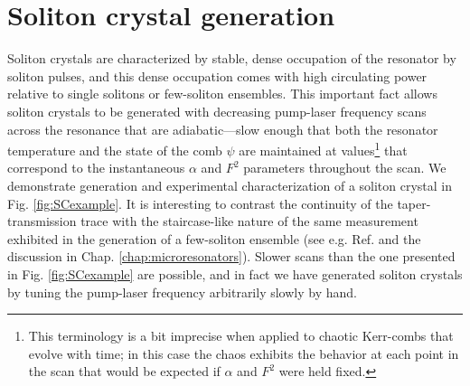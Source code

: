 \section{Soliton crystal generation}

Soliton crystals are characterized by stable, dense occupation of the resonator by soliton pulses, and this dense occupation comes with high circulating power relative to single solitons or few-soliton ensembles. This important fact allows soliton crystals to be generated with decreasing pump-laser frequency scans across the resonance that are adiabatic---slow enough that both the resonator temperature and the state of the comb $\psi$ are maintained at values\footnote{This terminology is a bit imprecise when applied to chaotic Kerr-combs that evolve with time; in this case the chaos exhibits the behavior at each point in the scan that would be expected if $\alpha$ and $F^2$ were held fixed.} that correspond to the instantaneous $\alpha$ and $F^2$ parameters throughout the scan. We demonstrate generation and experimental characterization of a soliton crystal in Fig. \ref{fig:SCexample}. It is interesting to contrast the continuity of the taper-transmission trace with the staircase-like nature of the same measurement exhibited in the generation of a few-soliton ensemble (see e.g. Ref.  and the discussion in Chap. \ref{chap:microresonators}). Slower scans than the one presented in Fig. \ref{fig:SCexample} are possible, and in fact we have generated soliton crystals by tuning the pump-laser frequency arbitrarily slowly by hand.

